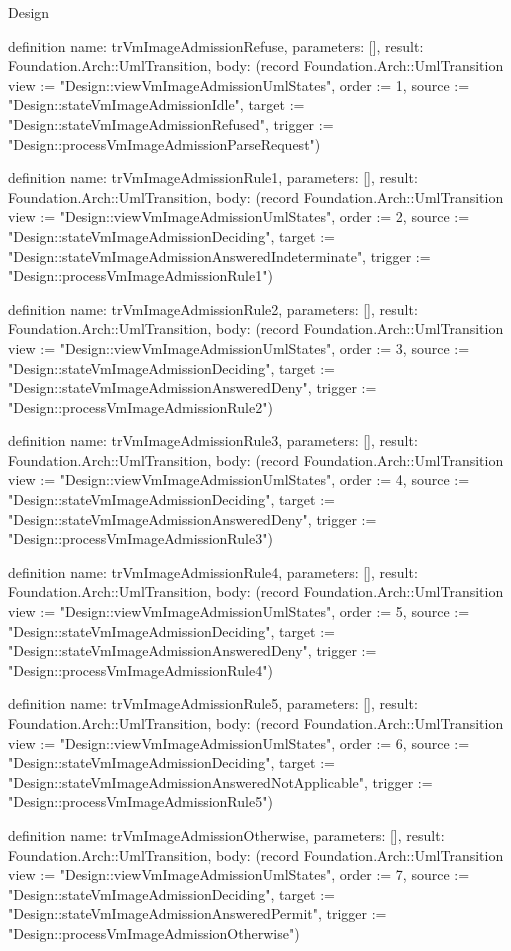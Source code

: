 \begin{lexlean}{Design}
\begin{semanticmodule}
definition{
  name: trVmImageAdmissionRefuse,
  parameters: [],
  result: Foundation.Arch::UmlTransition,
  body: (record Foundation.Arch::UmlTransition {view := "Design::viewVmImageAdmissionUmlStates", order := 1, source := "Design::stateVmImageAdmissionIdle", target := "Design::stateVmImageAdmissionRefused", trigger := "Design::processVmImageAdmissionParseRequest"})
}

definition{
  name: trVmImageAdmissionRule1,
  parameters: [],
  result: Foundation.Arch::UmlTransition,
  body: (record Foundation.Arch::UmlTransition {view := "Design::viewVmImageAdmissionUmlStates", order := 2, source := "Design::stateVmImageAdmissionDeciding", target := "Design::stateVmImageAdmissionAnsweredIndeterminate", trigger := "Design::processVmImageAdmissionRule1"})
}

definition{
  name: trVmImageAdmissionRule2,
  parameters: [],
  result: Foundation.Arch::UmlTransition,
  body: (record Foundation.Arch::UmlTransition {view := "Design::viewVmImageAdmissionUmlStates", order := 3, source := "Design::stateVmImageAdmissionDeciding", target := "Design::stateVmImageAdmissionAnsweredDeny", trigger := "Design::processVmImageAdmissionRule2"})
}

definition{
  name: trVmImageAdmissionRule3,
  parameters: [],
  result: Foundation.Arch::UmlTransition,
  body: (record Foundation.Arch::UmlTransition {view := "Design::viewVmImageAdmissionUmlStates", order := 4, source := "Design::stateVmImageAdmissionDeciding", target := "Design::stateVmImageAdmissionAnsweredDeny", trigger := "Design::processVmImageAdmissionRule3"})
}

definition{
  name: trVmImageAdmissionRule4,
  parameters: [],
  result: Foundation.Arch::UmlTransition,
  body: (record Foundation.Arch::UmlTransition {view := "Design::viewVmImageAdmissionUmlStates", order := 5, source := "Design::stateVmImageAdmissionDeciding", target := "Design::stateVmImageAdmissionAnsweredDeny", trigger := "Design::processVmImageAdmissionRule4"})
}

definition{
  name: trVmImageAdmissionRule5,
  parameters: [],
  result: Foundation.Arch::UmlTransition,
  body: (record Foundation.Arch::UmlTransition {view := "Design::viewVmImageAdmissionUmlStates", order := 6, source := "Design::stateVmImageAdmissionDeciding", target := "Design::stateVmImageAdmissionAnsweredNotApplicable", trigger := "Design::processVmImageAdmissionRule5"})
}

definition{
  name: trVmImageAdmissionOtherwise,
  parameters: [],
  result: Foundation.Arch::UmlTransition,
  body: (record Foundation.Arch::UmlTransition {view := "Design::viewVmImageAdmissionUmlStates", order := 7, source := "Design::stateVmImageAdmissionDeciding", target := "Design::stateVmImageAdmissionAnsweredPermit", trigger := "Design::processVmImageAdmissionOtherwise"})
}


\end{semanticmodule}
\end{lexlean}
